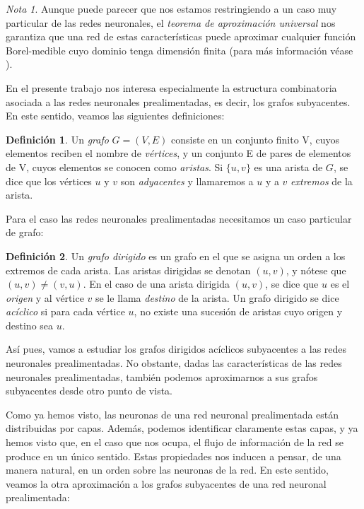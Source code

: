 \documentclass[12pt, a4paper, twoside]{book}
\numberwithin{equation}{section}
\theoremstyle{definition}
\newtheorem{defi}{Definición}[section]
\theoremstyle{remark}
\newtheorem*{remark}{Nota}
\theoremstyle{plain}
\begin{document}
	\begin{remark}
	Aunque puede parecer que nos 
	estamos restringiendo a un caso muy particular de las redes 
	neuronales, el \emph{teorema de aproximación universal} nos garantiza
	que una red de estas características puede aproximar cualquier función
	Borel-medible cuyo dominio tenga dimensión finita (para más 
	información véase \cite{TeoremaAproxUn-Kurt}).
	\end{remark}

	En el presente trabajo nos interesa especialmente la estructura 
	combinatoria asociada a las redes neuronales prealimentadas, es decir, 
	los grafos subyacentes. En este sentido, veamos las siguientes 
	definiciones:

	\begin{defi}
		Un \textit{grafo} $G=(V,E)$ consiste en un conjunto finito V, 
		cuyos 
		elementos reciben el nombre de \textit{vértices}, y un 
		conjunto 
		E de pares de elementos de V, cuyos elementos se conocen como 
		\textit{aristas}. Si $\{u,v\}$ es una arista de $G$, se dice 
		que los vértices $u$ y $v$ son \textit{adyacentes} y 
		llamaremos a $u$ y a $v$ \textit{extremos} de la arista.
	\end{defi}

	Para el caso las redes neuronales prealimentadas necesitamos un caso 
	particular de grafo:
	
	\begin{defi}
		Un \textit{grafo dirigido} es un grafo en el que se asigna un 
		orden a los extremos de cada arista. Las aristas dirigidas se
		denotan $(u,v)$, y nótese que $(u,v)\neq(v,u)$. En el 
		caso de una arista dirigida $(u,v)$, se dice que $u$ es el 
		\textit{origen} y al vértice $v$ se le llama \textit{destino} 
		de la arista. Un grafo dirigido se dice \textit{acíclico} si 
		para cada vértice $u$, no existe una sucesión de aristas cuyo
		origen y destino sea $u$.
	\end{defi}

	Así pues, vamos a estudiar los grafos dirigidos acíclicos 
	subyacentes a las redes neuronales prealimentadas. No obstante, dadas 
	las características de las redes neuronales prealimentadas, también 
	podemos aproximarnos a sus grafos subyacentes desde otro punto de 
	vista. 

	Como ya hemos visto, las neuronas de una red neuronal prealimentada 
	están
	distribuidas por capas. Además, podemos identificar claramente estas 
	capas, y ya hemos visto que, en el caso que nos ocupa, el flujo de 
	información de la red se produce en un único sentido. Estas 
	propiedades nos inducen a pensar, de una manera natural, en un orden 
	sobre las neuronas de la red. 
	En este sentido, veamos la otra aproximación a los grafos subyacentes
	de una red neuronal prealimentada:
\end{document}
